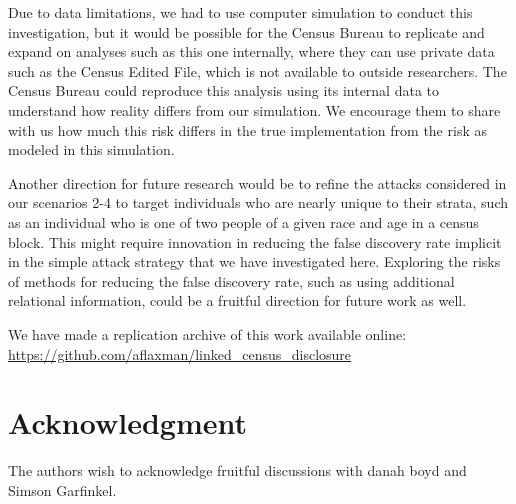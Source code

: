 \documentclass{jpc} %
\theoremstyle{plain}\newtheorem{satz}[thm]{Satz} %
\begin{document}
Due to data limitations, we had to use computer simulation to conduct this investigation, but it would be possible for the Census Bureau to replicate and expand on analyses such as this one internally, where they can use private data such as the Census Edited File, which is not available to outside researchers.  The Census Bureau could reproduce this analysis using its internal data to understand how reality differs from our simulation. We encourage them to share with us how much this risk differs in the true implementation from the risk as modeled in this simulation.

Another direction for future research would be to refine the attacks considered in our scenarios 2-4 to target individuals who are nearly unique to their strata, such as an individual who is one of two people of a given race and age in a census block.  This might require innovation in reducing the false discovery rate implicit in the simple attack strategy that we have investigated here.  Exploring the risks of methods for reducing the false discovery rate, such as using additional relational information, could be a fruitful direction for future work as well.

We have made a replication archive of this work available online: \url{https://github.com/aflaxman/linked_census_disclosure}%
 
\section*{Acknowledgment}
  \noindent The authors wish to acknowledge fruitful discussions with danah boyd and Simson Garfinkel.%




\end{document}
